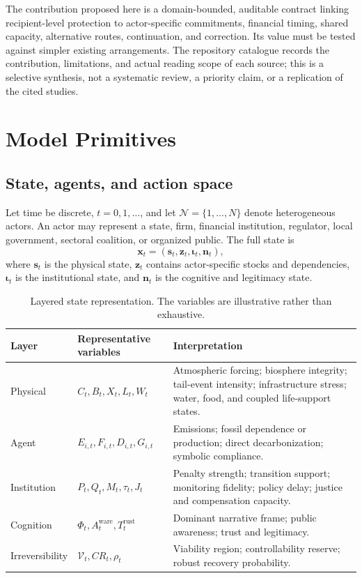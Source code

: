 \documentclass[11pt,a4paper]{article}
\numberwithin{equation}{section}
\theoremstyle{definition}
\theoremstyle{plain}
\theoremstyle{remark}
\newcommand{\state}{\bm{x}}
\newcommand{\inst}{\bm{\iota}}
\newcommand{\narr}{\bm{n}}
\begin{document}
The contribution proposed here is a domain-bounded, auditable contract linking recipient-level protection to actor-specific commitments, financial timing, shared capacity, alternative routes, continuation, and correction. Its value must be tested against simpler existing arrangements. The repository catalogue records the contribution, limitations, and actual reading scope of each source; this is a selective synthesis, not a systematic review, a priority claim, or a replication of the cited studies.

\section{Model Primitives}

\subsection{State, agents, and action space}

Let time be discrete, $t=0,1,\ldots$, and let $\mathcal N=\{1,\ldots,N\}$ denote heterogeneous actors. An actor may represent a state, firm, financial institution, regulator, local government, sectoral coalition, or organized public. The full state is
\begin{equation}
  \state_t = (\bm{s}_t,\bm{z}_t,\inst_t,\narr_t),
  \label{eq:fullstate}
\end{equation}
where $\bm{s}_t$ is the physical state, $\bm{z}_t$ contains actor-specific stocks and dependencies, $\inst_t$ is the institutional state, and $\narr_t$ is the cognitive and legitimacy state.

\begin{table}[H]
\centering
\caption{Layered state representation. The variables are illustrative rather than exhaustive.}
\label{tab:layers}
\begin{tabularx}{\textwidth}{@{}L{0.18\textwidth}L{0.26\textwidth}Y@{}}
\toprule
\textbf{Layer} & \textbf{Representative variables} & \textbf{Interpretation} \\
\midrule
Physical & $C_t,B_t,X_t,L_t,W_t$ & Atmospheric forcing; biosphere integrity; tail-event intensity; infrastructure stress; water, food, and coupled life-support states. \\
Agent & $E_{i,t},F_{i,t},D_{i,t},G_{i,t}$ & Emissions; fossil dependence or production; direct decarbonization; symbolic compliance. \\
Institution & $P_t,Q_t,M_t,\tau_t,J_t$ & Penalty strength; transition support; monitoring fidelity; policy delay; justice and compensation capacity. \\
Cognition & $\Phi_t,A_t^{\mathrm{ware}},T_t^{\mathrm{rust}}$ & Dominant narrative frame; public awareness; trust and legitimacy. \\
Irreversibility & $\mathcal V_t,CR_t,\rho_t$ & Viability region; controllability reserve; robust recovery probability. \\
\bottomrule
\end{tabularx}
\end{table}
\end{document}
